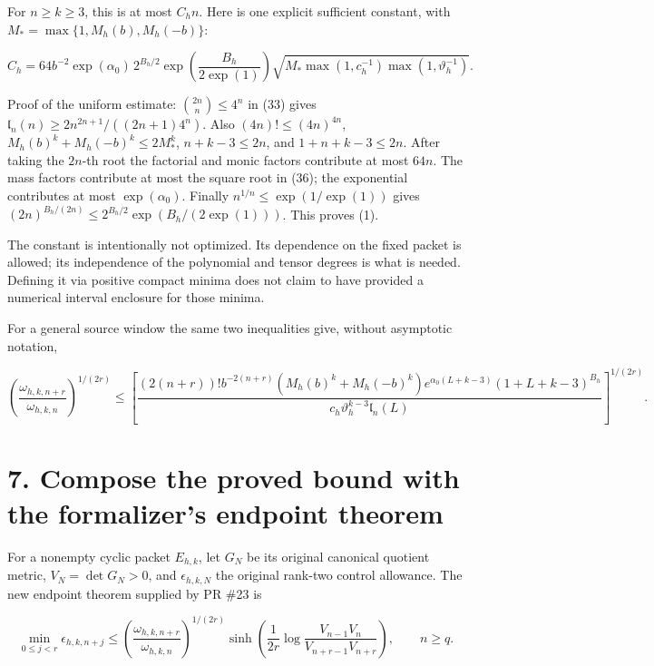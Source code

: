 For \(n\ge k\ge3\), this is at most \(C_hn\). Here is one explicit
sufficient constant, with \(M_* =\max\{1,M_h(b),M_h(-b)\}\):

\[
 \boxed{
 C_h=64b^{-2}\exp(\alpha_0)\,2^{B_h/2}
       \exp\!\left(\frac{B_h}{2\exp(1)}\right)
       \sqrt{M_*\max(1,c_h^{-1})\max(1,\vartheta_h^{-1})}.
 }                                                                     \tag{36}
\]

Proof of the uniform estimate: \(\binom{2n}{n}\le4^n\) in (33) gives
\(\mathfrak l_n(n)\ge2n^{2n+1}/((2n+1)4^n)\). Also
\((4n)!\le(4n)^{4n}\), \(M_h(b)^k+M_h(-b)^k\le2M_*^k\), \(n+k-3\le2n\),
and \(1+n+k-3\le2n\). After taking the \(2n\)-th root the factorial and
monic factors contribute at most \(64n\). The mass factors contribute at
most the square root in (36); the exponential contributes at most
\(\exp(\alpha_0)\). Finally \(n^{1/n}\le\exp(1/\exp(1))\) gives
\((2n)^{B_h/(2n)}\le2^{B_h/2}\exp(B_h/(2\exp(1)))\). This proves (1).

The constant is intentionally not optimized. Its dependence on the fixed
packet is allowed; its independence of the polynomial and tensor degrees
is what is needed. Defining it via positive compact minima does not
claim to have provided a numerical interval enclosure for those minima.

For a general source window the same two inequalities give, without
asymptotic notation,

\[
 \left(\frac{\omega_{h,k,n+r}}{\omega_{h,k,n}}\right)^{1/(2r)}
 \le\left[
 \frac{(2(n+r))!b^{-2(n+r)}(M_h(b)^k+M_h(-b)^k)
       e^{\alpha_0(L+k-3)}(1+L+k-3)^{B_h}}
      {c_h\vartheta_h^{k-3}\mathfrak l_n(L)}
       \right]^{1/(2r)}.                                               \tag{37}
\]

\section{7. Compose the proved bound with the formalizer's endpoint
theorem}\label{compose-the-proved-bound-with-the-formalizers-endpoint-theorem}

For a nonempty cyclic packet \(E_{h,k}\), let \(G_N\) be its original
canonical quotient metric, \(V_N=\det G_N>0\), and \(\epsilon_{h,k,N}\)
the original rank-two control allowance. The new endpoint theorem
supplied by PR \#23 is

\[
 \min_{0\le j<r}\epsilon_{h,k,n+j}
 \le
 \left(\frac{\omega_{h,k,n+r}}{\omega_{h,k,n}}\right)^{1/(2r)}
 \sinh\!\left(\frac1{2r}
       \log\frac{V_{n-1}V_n}{V_{n+r-1}V_{n+r}}\right),\qquad n\ge q.
                                                                         \tag{38}
\]

